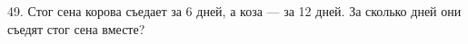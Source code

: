 49. Стог сена корова съедает за 6 дней, а коза --- за 12 дней. За сколько дней они съедят стог сена вместе?\\
